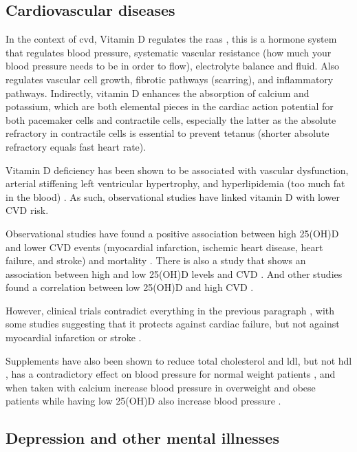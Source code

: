\subsection{Cardiovascular diseases}

In the context of \gls{cvd}, Vitamin D regulates the \gls{raas} \cite{ref:Kassi2013}, this is a hormone system that regulates blood pressure, systematic vascular resistance (how much your blood pressure needs to be in order to flow), electrolyte balance and fluid. Also regulates vascular cell growth, fibrotic pathways (scarring), and inflammatory pathways. Indirectly, vitamin D enhances the absorption of calcium and potassium, which are both elemental pieces in the cardiac action potential for both pacemaker cells and contractile cells, especially the latter as the absolute refractory in contractile cells is essential to prevent tetanus (shorter absolute refractory equals fast heart rate).

Vitamin D deficiency has been shown to be associated with vascular dysfunction, arterial stiffening left ventricular hypertrophy, and hyperlipidemia (too much fat in the blood) \cite{ref:AlMheid2017}. As such, observational studies have linked vitamin D with lower CVD risk.

Observational studies have found a positive association between high 25(OH)D and lower CVD events (myocardial infarction, ischemic heart disease, heart failure, and stroke) and mortality \cite{ref:Zhang2017}. There is also a study that shows an association between high and low 25(OH)D levels and CVD \cite{ref:Durup2015}. And other studies found a correlation between low 25(OH)D and high CVD \cite{ref:Zhou2018, ref:BrndumJacobsen2012}.

However, clinical trials contradict everything in the previous paragraph \cite{ref:Manson2019, ref:Scragg2017, ref:Bouillon2021}, with some studies suggesting that it protects against cardiac failure, but not against myocardial infarction or stroke \cite{ref:Ford2014}.

Supplements have also been shown to reduce total cholesterol and \gls{ldl}, but not \gls{hdl} \cite{ref:Dibaba2019}, has a contradictory effect on blood pressure for normal weight patients \cite{ref:Golzarand2016, ref:Beveridge2015}, and when taken with calcium increase blood pressure in overweight and obese patients while having low 25(OH)D also increase blood pressure \cite{ref:Golzarand2016, ref:Vimaleswaran2014}.


\subsection{Depression and other mental illnesses}

